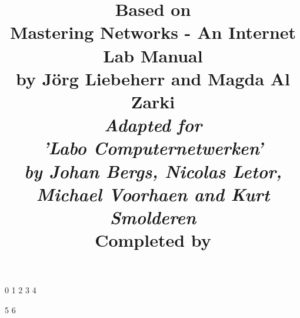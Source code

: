 

\title{
\textbf{Based on \\ Mastering Networks - An Internet Lab Manual\\
by J\"{o}rg Liebeherr and Magda Al Zarki}\\
\vspace{10mm}
\large{\emph{Adapted for \\ 'Labo Computernetwerken' \\
by Johan Bergs, Nicolas Letor, Michael Voorhaen and Kurt Smolderen}} \\
\vspace{10mm}
\large{Completed by}
\vspace{-10mm}
}




\frontmatter
\maketitle

\mainmatter
%
\setcounter {chapter} {0}
%
\setcounter {chapter} {1}
%
\setcounter {chapter} {2}
%
\setcounter {chapter} {3}
%
\setcounter {chapter} {4}

\setcounter {chapter} {5}
%
\setcounter {chapter} {6}
%
\backmatter


 
